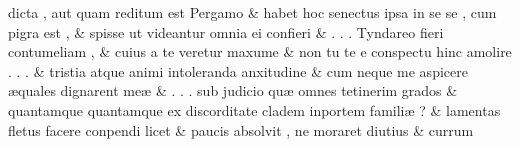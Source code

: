 \documentclass[12pt,onecolumn,twoside,a4paper]{memoir}
\begin{document}
\begin{pairs}
\begin{Leftside}
      dicta
      ,
      aut
      quam
      reditum
      est
      Pergamo \&
                         \stanza {}habet
      hoc
      senectus
      ipsa
      in
      se
      {
      se
      }
      ,
      cum
      pigra
      est
      , & 
                     spisse
      ut
      videantur
      omnia
      {
      ei
      }
      confieri \&
                         \stanza {}.
      .
      .
      Tyndareo
      fieri
      contumeliam
      , & 
                     cuius
      a
      te
      veretur
      maxume \&
                         \stanza {}
                     non
      tu
      te
      e
      conspectu
      hinc
      amolire
      .
      .
      . \&
                         \stanza {}
                     tristia
      atque
      animi
      intoleranda
      anxitudine \&
                         \stanza {}
                     cum
      neque
      me
      aspicere
      æquales
      dignarent
      meæ \&
                         \stanza {}
                     .
      .
      .
      sub
      judicio
      quæ
      omnes
      tetinerim
      grados \&
                         \stanza {}
                      quantamque
      {quantamque}
      ex
      discorditate
      cladem
      inportem
      familiæ
      ? \&
                         \stanza {}
                      lamentas
      fletus
      facere
      conpendi
      licet \&
                         \stanza {}
                      paucis
      absolvit
      ,
      ne
      moraret
      diutius \&
                         \stanza {}
                     currum

\end{Leftside}
\end{pairs}
\end{document}
